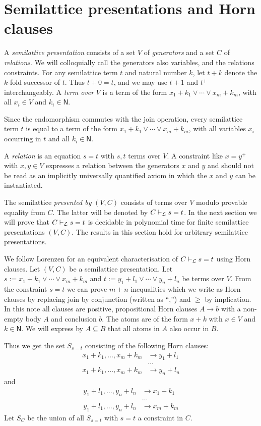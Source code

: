 \documentclass[11pt,a4paper]{article}
\newcommand{\N}{\mathsf{N}}
\newcommand\jterm[3]{{{#1_1}+{#2_1}}\vee\cdots\vee{{#1_#3}+{#2_#3}}}
\newcommand\jbody[3]{{{#1_1}+{#2_1}},\ldots,{{#1_#3}+{#2_#3}}}
\newcommand\lathy{{\cal L}}
\newcommand\prvL{\vdash_{\lathy}}
\newcommand{\FYI}[1]{{\color{red}#1}}
\begin{document}
\section{Semilattice presentations and Horn clauses}\label{sec:latt-Horn}

A \emph{semilattice presentation} consists of a
set $V$ of \emph{generators} and a set $C$ of \emph{relations}.
We will colloquially call the generators also variables, and the
relations constraints.
For any semilattice term $t$ and natural number $k$, 
let $t+k$ denote the $k$-fold successor of $t$.
Thus $t+0 = t$, and we may use $t+1$ and $t^+$ interchangeably. 
A \emph{term over} $V$ is
a term of the form $\jterm{x}{k}{m}$, 
with all $x_i\in V$ and $k_i\in \N$.
 
Since the endomorphism commutes with the join operation,
every semilattice term $t$ is equal to a term of the
form $\jterm{x}{k}{m}$, with all variables $x_i$ occurring in $t$
and all $k_i\in \N$.

A \emph{relation} is an equation $s=t$ with $s,t$ terms over $V$.
A constraint like $x=y^+$ with $x,y\in V$
expresses a relation between the generators $x$ and $y$ and 
should not be read as an implicitly universally quantified axiom
in which the $x$ and $y$ can be instantiated.

The semilattice \emph{presented by} $(V,C)$ consists of terms over $V$
modulo provable equality from $C$. The latter will be denoted
by $C\prvL s=t$. In the next section we will prove that
$C\prvL s=t$ is decidable in polynomial time for finite semilattice presentations $(V,C)$.
The results in this section hold for arbitrary semilattice presentations.

We follow Lorenzen \cite[Section 2]{Lorenzen51} for an equivalent 
characterisation of $C\prvL s=t$ using Horn clauses.
Let $(V,C)$ be a semilattice presentation.
Let $s:= \jterm{x}{k}{m}$ and $t:= \jterm{y}{l}{n}$ be
terms over $V$. From the constraint $s=t$
we can prove $m+n$ inequalities which we write as
Horn clauses by replacing join by conjunction (written as ``,'') and $\geq$
by implication. \FYI{In this note all clauses are positive,
propositional Horn clauses $A\to b$ with a non-empty body $A$ and conclusion $b$.
The atoms are of the form $x+k$ with $x\in V$ and $k\in \N$. 
We will express by $A\subseteq B$ that all atoms in $A$ also occur in $B$.}

Thus we get the set $S_{s=t}$ consisting of the following Horn clauses:
\begin{align*}
\jbody{x}{k}{m} &\to y_1+l_1 \\
&\ldots  \\
\jbody{x}{k}{m} &\to y_n+l_n 
\end{align*}
and
\begin{align*}
\jbody{y}{l}{n} &\to x_1+k_1 \\
&\ldots \\
\jbody{y}{l}{n} &\to x_m+k_m 
\end{align*}
Let $S_C$ be the union of all $S_{s=t}$ with $s=t$ 
a constraint in $C$.
\end{document}
